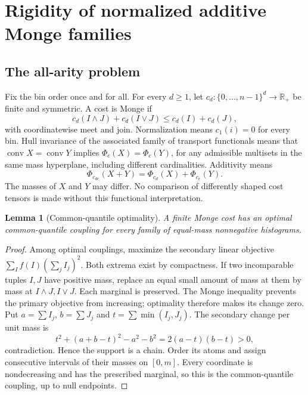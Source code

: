 \documentclass[11pt]{article}
\newtheorem{lemma}[theorem]{Lemma}
\theoremstyle{definition}\newtheorem{definition}[theorem]{Definition}
\newcommand{\R}{\mathbb R}
\newcommand{\1}{\mathbf 1}
\newcommand{\conv}{\operatorname{conv}}
\begin{document}
\section{Rigidity of normalized additive Monge families}
\subsection{The all-arity problem}
Fix the bin order once and for all. For every $d\ge1$, let
$c_d:\{0,\ldots,n-1\}^d\to\R_+$ be finite and symmetric. A cost is Monge if
\[
 c_d(I\wedge J)+c_d(I\vee J)\le c_d(I)+c_d(J),
\]
with coordinatewise meet and join. Normalization means $c_1(i)=0$ for every bin.
Hull invariance of the associated family of transport functionals means that
$\conv X=\conv Y$ implies $\Phi_c(X)=\Phi_c(Y)$, for any admissible multisets
in the same mass hyperplane, including different cardinalities. Additivity means
\[
 \Phi_{c_{de}}(X+Y)=\Phi_{c_d}(X)+\Phi_{c_e}(Y).
\]
The masses of $X$ and $Y$ may differ. No comparison of differently shaped cost
tensors is made without this functional interpretation.

\begin{lemma}[Common-quantile optimality]\label{lem:monge}
A finite Monge cost has an optimal common-quantile coupling for every family of
equal-mass nonnegative histograms.
\end{lemma}
\begin{proof}
Among optimal couplings, maximize the secondary linear objective
$\sum_I f(I)(\sum_j I_j)^2$. Both extrema exist by compactness. If two
incomparable tuples $I,J$ have positive mass, replace an equal small amount of
mass at them by mass at $I\wedge J,I\vee J$. Each marginal is preserved.
The Monge inequality prevents the primary objective from increasing; optimality
therefore makes its change zero. Put $a=\sum I_j$, $b=\sum J_j$ and
$t=\sum\min(I_j,J_j)$. The secondary change per unit mass is
\[
 t^2+(a+b-t)^2-a^2-b^2=2(a-t)(b-t)>0,
\]
contradiction. Hence the support is a chain. Order its atoms and assign
consecutive intervals of their masses on $[0,m]$. Every coordinate is
nondecreasing and has the prescribed marginal, so this is the common-quantile
coupling, up to null endpoints.
\end{proof}
\end{document}
